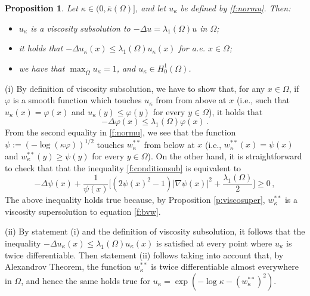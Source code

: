 \documentclass[11pt]{amsart}
\newtheorem{proposition}[theorem]{Proposition}
\theoremstyle{definition}
\theoremstyle{remark}
\def\Om{\Omega}
\def\k{\kappa}
\begin{document}
\begin{proposition}\label{p:salani}   Let $\k \in (0, \overline \k (\Om)]$, and let $ u_\k$ be defined by  \eqref{f:normu}. 
Then: 
\begin{itemize}
\item[(i)]  $u_\k$ is a viscosity subsolution to $-\Delta u = \lambda _ 1 (\Om ) u$ in $\Om$; 
\smallskip 

\item[(ii)] it holds that $-\Delta   u_\k  (x) \leq  \lambda _ 1 (\Om )   u _\k (x) $ for a.e. $x \in \Om$;
\smallskip 

\item[(iii)]    we have that $\max _{\overline \Om } u _ \k   = 1$,  and $ u_\k  \in H ^1 _0 (\Om)$.
\end{itemize} 
\end{proposition} 


\proof   (i) By definition of viscosity subsolution, we have to show that, for any $x \in \Om$, if $\varphi$ is a smooth function  
which touches $ u_\k$ from from above  at $x$ (i.e.,  such that $ u_\k(x) = \varphi(x)$ and  $ u_\k (y) \leq \varphi (y)$ for every $y\in\Omega$),
it holds that
\begin{equation}\label{f:conditionsub} - \Delta \varphi (x)  \leq \lambda _ 1 (\Om) \varphi  (x) \,.
\end{equation}
From the second equality in \eqref{f:normu}, we see that the function $\psi :=(- \log (\k  \varphi) ) ^ {1/2}  $ touches $w _\k   ^{**} $ from below at  $x$ 
  (i.e.,   $w_\k  ^ {**} (x) = \psi(x)$ and  $ w _\k  ^ {**}  (y)  \geq   \psi (y)$ for every $y\in\Omega$). On the other hand, 
  it is straightforward to check that that the inequality  \eqref{f:conditionsub} is equivalent to 
  \begin{equation}\label{f:conditionsuper}  
    - \Delta \psi  (x) + \frac{1}{\psi (x) } \big [ ( 2 \psi  (x) ^ 2 -1 ) |\nabla \psi (x)| ^ 2 +\frac{\lambda _ 1 (\Om) }{2} \big ] \geq 0  \,,\end{equation} 
The above inequality holds true because,  by Proposition \ref{p:viscosuper}, $w _ \k ^{**}$ is a viscosity  supersolution  to  equation  \eqref{f:bvw}.

\smallskip
(ii) By statement  (i) and the definition of viscosity subsolution, it follows that the inequality   $-\Delta   u_\k  (x) \leq  \lambda _ 1 (\Om )   u_\k (x) $  is satisfied at every point where $ u_\k$ is twice differentiable. Then statement (ii) follows taking into account that, by Alexandrov Theorem, the function $ w _ \k   ^ {**}$ is twice differentiable almost everywhere in $\Om$, and hence the same holds true for $u_\k = \exp (  - \log \k -  ( w _\k ^ {**} ) ^ 2  )$. 
\end{document}
